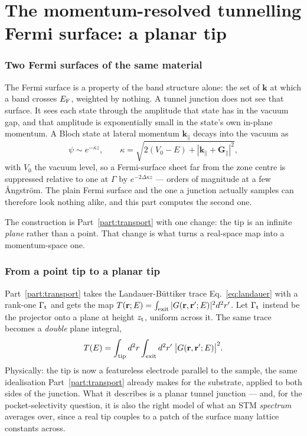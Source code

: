 \documentclass[11pt]{article}
\begin{document}
\part{The momentum-resolved tunnelling Fermi surface: a planar tip}
\label{part:fermitunnel}

\section{Two Fermi surfaces of the same material}

The Fermi surface is a property of the band structure alone: the set of
$\mathbf k$ at which a band crosses $E_{\rm F}$, weighted by nothing. A
tunnel junction does not see that surface. It sees each state through the
amplitude that state has in the vacuum gap, and that amplitude is
exponentially small in the state's own in-plane momentum. A Bloch state at
lateral momentum $\mathbf k_\parallel$ decays into the vacuum as
\begin{equation}
  \psi \sim e^{-\kappa z},
  \qquad
  \kappa = \sqrt{2(V_0-E) + |\mathbf k_\parallel + \mathbf G_\parallel|^2},
  \label{eq:kappa}
\end{equation}
with $V_0$ the vacuum level, so a Fermi-surface sheet far from the zone
centre is suppressed relative to one at $\Gamma$ by $e^{-2\Delta\kappa z}$ ---
orders of magnitude at a few {\AA}ngstr\"om. The plain Fermi surface and the
one a junction actually samples can therefore look nothing alike, and this
part computes the second one.

The construction is Part~\ref{part:transport} with one change: the tip is an
infinite \emph{plane} rather than a point. That change is what turns a
real-space map into a momentum-space one.

\section{From a point tip to a planar tip}

Part~\ref{part:transport} takes the Landauer-B\"uttiker trace
Eq.~\eqref{eq:landauer} with a rank-one $\Gamma_{\rm t}$ and gets the map
$T(\mathbf r;E)=\int_{\rm exit}|G(\mathbf r,\mathbf r';E)|^2 d^2r'$. Let
$\Gamma_{\rm t}$ instead be the projector onto a plane at height $z_{\rm t}$,
uniform across it. The same trace becomes a \emph{double} plane integral,
\begin{equation}
  T(E) = \int_{\rm tip} d^2r \int_{\rm exit} d^2r'\;
         \big|G(\mathbf r,\mathbf r';E)\big|^2 .
  \label{eq:planetrans}
\end{equation}
Physically: the tip is now a featureless electrode parallel to the sample, the
same idealisation Part~\ref{part:transport} already makes for the substrate,
applied to both sides of the junction. What it describes is a planar tunnel
junction --- and, for the pocket-selectivity question, it is also the right
model of what an STM \emph{spectrum} averages over, since a real tip couples
to a patch of the surface many lattice constants across.
\end{document}
